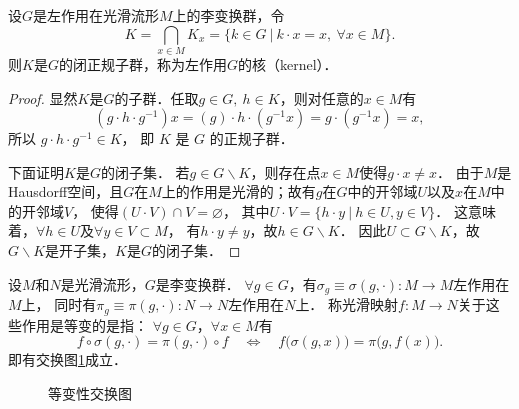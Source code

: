 \begin{theorem}\label{chlg:thm_subclosed}
    设$G$是左作用在光滑流形$M$上的李变换群，令
    \begin{equation}\label{chlg:eqn_clinvsub}
        K=\bigcap_{x\in M} K_x=\{k \in G \ |\ k \cdot x=x,\ \forall x \in M\}.
    \end{equation}
    则$K$是$G$的闭正规子群，称为左作用$G$的{\heiti 核}（kernel）．
\end{theorem}
\begin{proof}
    显然$K$是$G$的子群．任取$g \in G,\ h \in K$，则对任意的$x \in M$有
    \begin{equation}
        \left(g \cdot h \cdot g^{-1}\right) x  =(g) \cdot h \cdot\left(g^{-1} x\right) 
        =g \cdot\left(g^{-1} x\right) =x,
    \end{equation}
    所以 $g \cdot h \cdot g^{-1} \in K$， 即 $K$ 是 $G$ 的正规子群．
    
    下面证明$K$是$G$的闭子集． 若$g \in G \backslash K$，则存在点$x \in M$使得$g\cdot x \neq x$．
    由于$M$是Hausdorff空间，且$G$在$M$上的作用是光滑的；故有$g$在$G$中的开邻域$U$以及$x$在$M$中的开邻域$V$，
    使得$(U \cdot V) \cap V=\varnothing$，
    其中$U \cdot V=\{h \cdot y \ |\ h \in U, y \in V\}$．
    这意味着，$\forall h \in U$及$\forall y \in V\subset M$，
    有$h \cdot y \neq y$，故$h \in G \backslash K$．
    因此$U \subset G \backslash K$，故$G \backslash K$是开子集，$K$是$G$的闭子集．
\end{proof}






\begin{definition}\label{chlg:def_equivariant}
    设$M$和$N$是光滑流形，$G$是李变换群．
    $\forall g\in G$，有$\sigma_g\equiv \sigma(g,\cdot): M\to M$左作用在$M$上，
    同时有$\pi_g\equiv \pi(g,\cdot):N\to N$左作用在$N$上．
    称光滑映射$f:M\to N$关于这些作用是{\heiti 等变的}是指：
    $\forall g\in G$，$\forall x\in M$有
    \begin{equation}\label{chlg:eqn_equivariant}
        f\circ \sigma(g,\cdot) = \pi(g,\cdot)\circ f
        \quad \Leftrightarrow \quad
        f\bigl( \sigma(g,x) \bigr) = \pi\bigl(g, f(x)\bigr) .
    \end{equation}
    即有交换图\ref{chlg:pic_eqv-exchange}成立．
\end{definition}

\begin{figure}[htb]
    \centering
    \caption{等变性交换图}\label{chlg:pic_eqv-exchange}
\end{figure}

